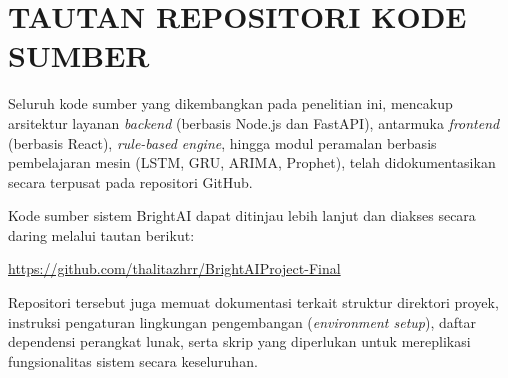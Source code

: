 \chapter{TAUTAN REPOSITORI KODE SUMBER}

Seluruh kode sumber yang dikembangkan pada penelitian ini, mencakup arsitektur layanan \textit{backend} (berbasis Node.js dan FastAPI), antarmuka \textit{frontend} (berbasis React), \textit{rule-based engine}, hingga modul peramalan berbasis pembelajaran mesin (LSTM, GRU, ARIMA, Prophet), telah didokumentasikan secara terpusat pada repositori GitHub. 

Kode sumber sistem BrightAI dapat ditinjau lebih lanjut dan diakses secara daring melalui tautan berikut:

\vspace{1em}
\begin{center}
    \url{https://github.com/thalitazhrr/BrightAIProject-Final}
\end{center}
\vspace{1em}

Repositori tersebut juga memuat dokumentasi terkait struktur direktori proyek, instruksi pengaturan lingkungan pengembangan (\textit{environment setup}), daftar dependensi perangkat lunak, serta skrip yang diperlukan untuk mereplikasi fungsionalitas sistem secara keseluruhan.